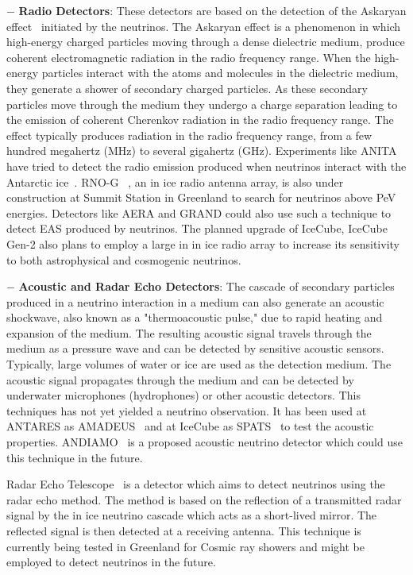\begin{description}
  \item $-$ \textbf{Radio Detectors}: These detectors are based on the detection of the Askaryan effect~\cite{} initiated by the neutrinos. The Askaryan effect is a phenomenon in which high-energy charged particles moving through a dense dielectric medium, produce coherent electromagnetic radiation in the radio frequency range.  When the high-energy particles interact with the atoms and molecules in the dielectric medium, they generate a shower of secondary charged particles. As these secondary particles move through the medium they undergo a charge separation leading to the emission of coherent Cherenkov radiation in the radio frequency range. The effect typically produces radiation in the radio frequency range, from a few hundred megahertz (MHz) to several gigahertz (GHz). Experiments like ANITA~\cite{} have tried to detect the radio emission produced when neutrinos interact with the Antarctic ice~\cite{}. RNO-G ~\cite{}, an in ice radio antenna array, is also under construction at Summit Station in Greenland to search for neutrinos above PeV energies. Detectors like AERA and GRAND could also use such a technique to detect EAS produced by neutrinos. The planned upgrade of IceCube, IceCube Gen-2 also plans to employ a large in in ice radio array to increase its sensitivity to both astrophysical and cosmogenic neutrinos. 
  
  \item $-$ \textbf{Acoustic and Radar Echo Detectors}:  The cascade of secondary particles produced in a neutrino interaction in a medium can also generate an acoustic shockwave, also known as a "thermoacoustic pulse," due to rapid heating and expansion of the medium. The resulting acoustic signal travels through the medium as a pressure wave and can be detected by sensitive acoustic sensors. Typically, large volumes of water or ice are used as the detection medium. The acoustic signal propagates through the medium and can be detected by underwater microphones (hydrophones) or other acoustic detectors. This techniques has not yet yielded a neutrino observation. It has been used at ANTARES as AMADEUS~\cite{} and at IceCube as SPATS~\cite{} to test the acoustic properties. ANDIAMO~\cite{} is a proposed acoustic neutrino detector which could use this technique in the future.
  
  Radar Echo Telescope~\cite{} is a detector which aims to detect neutrinos using the radar echo method. The method is based on the reflection of a transmitted radar signal by the in ice neutrino cascade which acts as a short-lived mirror. The reflected signal is then detected at a receiving antenna. This technique is currently being tested in Greenland for Cosmic ray showers and might be employed to detect neutrinos in the future.


\end{description}
